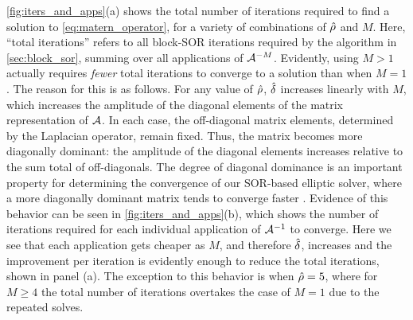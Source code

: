 \cref{fig:iters_and_apps}(a) shows the total number of iterations required to
find a solution to \cref{eq:matern_operator}, for a variety of combinations of
$\hat{\rho}$ and $M$.
Here, ``total iterations'' refers to all block-SOR iterations
required by the algorithm in \cref{sec:block_sor}, summing over all applications
of $\mathcal{A}^{-M}$.
Evidently, using $M>1$ actually requires \textit{fewer} total iterations to converge to a
solution than when $M=1$.
The reason for this is as follows.
For any value of $\hat{\rho}$, $\hat{\delta}$ increases linearly with $M$, which
increases the amplitude of the diagonal elements of the matrix representation of
$\mathcal{A}$.
In each case, the off-diagonal matrix elements, determined by the Laplacian
operator, remain fixed.
Thus, the matrix becomes more diagonally dominant:
the amplitude of the diagonal elements increases relative to the sum total of
off-diagonals.
The degree of diagonal dominance is an important property for
determining the convergence of our SOR-based elliptic solver, where a more
diagonally dominant matrix tends to converge faster \citep{golub_matrix_2013}.
Evidence of this behavior can be seen in \cref{fig:iters_and_apps}(b), which shows the
number of iterations required for each individual application of
$\mathcal{A}^{-1}$ to converge.
Here we see that each application gets cheaper as $M$, and therefore $\hat{\delta}$,
increases and the improvement per iteration is evidently enough to reduce the total
iterations, shown in panel (a).
The exception to this behavior is when $\hat{\rho} = 5$, where for $M\ge 4$
the total number of iterations overtakes the case of $M=1$ due to the repeated
solves.

